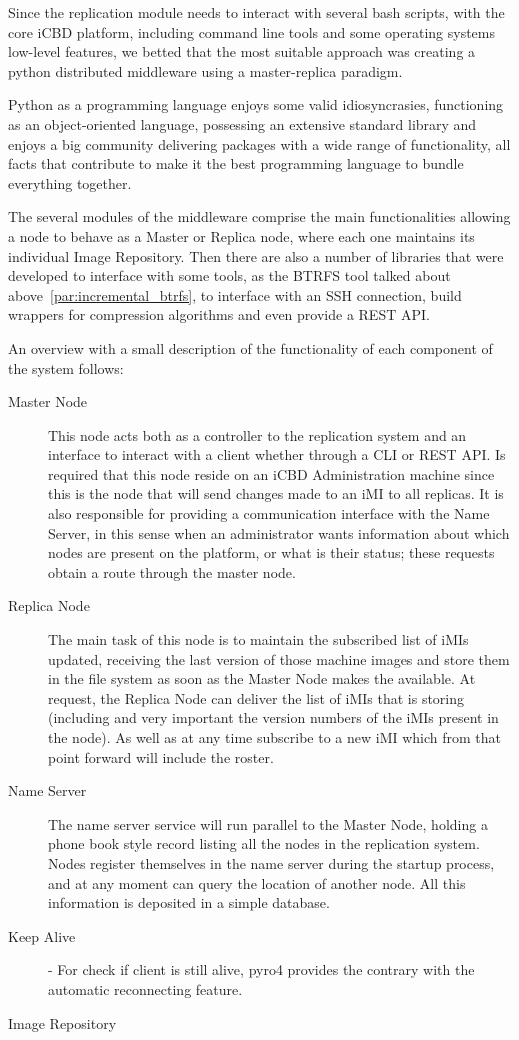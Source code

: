Since the replication module needs to interact with several bash scripts, with the core iCBD platform, including command line tools and some operating systems low-level features, we betted that the most suitable approach was creating a python distributed middleware using a master-replica paradigm.

Python as a programming language enjoys some valid idiosyncrasies, functioning as an object-oriented language, possessing an extensive standard library and enjoys a big community delivering packages with a wide range of functionality, all facts that contribute to make it the best programming language to bundle everything together.

The several modules of the middleware comprise the main functionalities allowing a node to behave as a Master or Replica node, where each one maintains its individual Image Repository. Then there are also a number of libraries that were developed to interface with some tools, as the BTRFS tool talked about above~\ref{par:incremental_btrfs}, to interface with an SSH connection, build wrappers for compression algorithms and even provide a REST API.

An overview with a small description of the functionality of each component of the system follows:

\begin{description}
	\item [Master Node] This node acts both as a controller to the replication system and an interface to interact with a client whether through a CLI or REST API. Is required that this node reside on an iCBD Administration machine since this is the node that will send changes made to an iMI to all replicas. It is also responsible for providing a communication interface with the Name Server, in this sense when an administrator wants information about which nodes are present on the platform, or what is their status; these requests obtain a route through the master node.
	\item [Replica Node] The main task of this node is to maintain the subscribed list of iMIs updated, receiving the last version of those machine images and store them in the file system as soon as the Master Node makes the available. At request, the Replica Node can deliver the list of iMIs that is storing (including and very important the version numbers of the iMIs present in the node). As well as at any time subscribe to a new iMI which from that point forward will include the roster.
	\item [Name Server] The name server service will run parallel to the Master Node, holding a phone book style record listing all the nodes in the replication system. Nodes register themselves in the name server during the startup process, and at any moment can query the location of another node. All this information is deposited in a simple database.
	\item [Keep Alive] - For check if client is still alive, pyro4 provides the contrary with the automatic reconnecting feature.
	\item [Image Repository]
\end{description}


